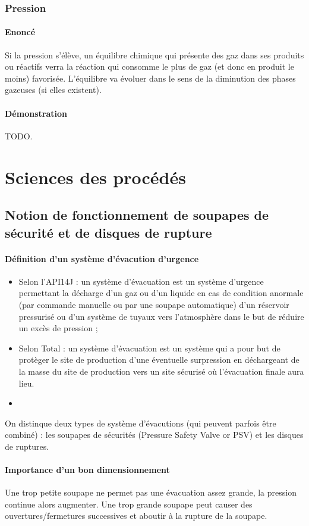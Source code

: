 \subsubsection{Pression}
\paragraph{Enoncé}
Si la pression s'élève, un équilibre chimique qui
présente des gaz dans ses produits ou réactifs verra la réaction
qui consomme le plus de gaz (et donc en produit le moins)
favorisée. L'équilibre va évoluer dans le sens de la diminution
des phases gazeuses (si elles existent).
\paragraph{Démonstration}
TODO.

\section{Sciences des procédés}
\subsection{Notion de fonctionnement de soupapes de sécurité et de disques de rupture}
\paragraph{Définition d'un système d'évacution d'urgence}
\begin{itemize}
	\item	Selon l'API14J : un système d'évacuation est un système
	d'urgence permettant la décharge d'un gaz ou d'un liquide en cas
	de condition anormale (par commande manuelle ou par une soupape
	automatique) d'un réservoir pressurisé ou d'un système de tuyaux
	vers l'atmosphère dans le but de réduire un excès de pression ;
	\item Selon Total : un système d'évacuation est un système qui
	a pour but de protèger le site de production d'une éventuelle
	surpression en déchargeant de la masse du site de production
	vers un site sécurisé où l'évacuation finale aura lieu.
	\item
\end{itemize}

On distinque deux types de système d'évacutions (qui peuvent
parfois être combiné) : les soupapes de sécurités (Pressure
Safety Valve or PSV) et les disques de ruptures.

\paragraph{Importance d'un bon dimensionnement}
Une trop petite soupape ne permet pas une évacuation
assez grande, la pression continue alors augmenter.
Une trop grande soupape peut causer des
ouvertures/fermetures successives et aboutir à la
rupture de la soupape.

